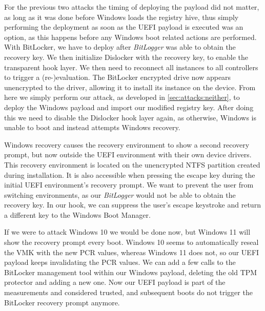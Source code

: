 \vspace{1em}



For the previous two attacks the timing of deploying the payload did not matter, as long as it was done before Windows loads the  registry hive, thus simply performing the deployment as soon as the \ac{UEFI} payload is executed was an option, as this happens before any Windows boot related actions are performed.
With BitLocker, we have to deploy after \emph{BitLogger} was able to obtain the recovery key.
We then initialize Dislocker with the recovery key, to enable the transparent  hook layer.
We then need to reconnect all  instances to all controllers to trigger a (re-)evaluation.
The BitLocker encrypted drive now appears unencrypted to the driver, allowing it to install its  instance on the device.
From here we simply perform our attack, as developed in \autoref{sec:attacks:neither}, to deploy the Windows payload and import our modified registry key.
After doing this we need to disable the Dislocker hook layer again, as otherwise, Windows is unable to boot and instead attempts Windows recovery.

Windows recovery causes the recovery environment to show a second recovery prompt, but now outside the \ac{UEFI} environment with their own device drivers.
This recovery environment is located on the unencrypted \ac{NTFS} partition created during installation.
It is also accessible when pressing the escape key during the initial \ac{UEFI} environment's recovery prompt.
We want to prevent the user from switching environments, as our \emph{BitLogger} would not be able to obtain the recovery key.
In our  hook, we can suppress the user's escape keystroke and return a different key to the Windows Boot Manager.

If we were to attack Windows 10 we would be done now, but Windows 11 will show the recovery prompt every boot.
Windows 10 seems to automatically reseal the \ac{VMK} with the new \ac{PCR} values, whereas Windows 11 does not, so our \ac{UEFI} payload keeps invalidating the \ac{PCR} values.
We can add a few calls to the BitLocker management tool  \cite{microsoft-bitlocker-manage-bde} within our Windows payload, deleting the old \ac{TPM} protector and adding a new one.
Now our \ac{UEFI} payload is part of the measurements and considered trusted, and subsequent boots do not trigger the BitLocker recovery prompt anymore.

